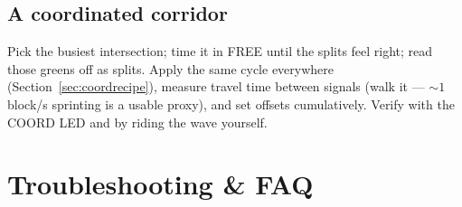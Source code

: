 \documentclass[11pt]{article}
\begin{document}
\subsection{A coordinated corridor}

Pick the busiest intersection; time it in FREE until the splits feel right; read
those greens off as splits. Apply the same cycle everywhere
(Section~\ref{sec:coordrecipe}), measure travel time between signals (walk it —
${\sim}1$ block/s sprinting is a usable proxy), and set offsets cumulatively.
Verify with the COORD LED and by riding the wave yourself.

\section{Troubleshooting \& FAQ}\label{sec:trouble}
\end{document}
